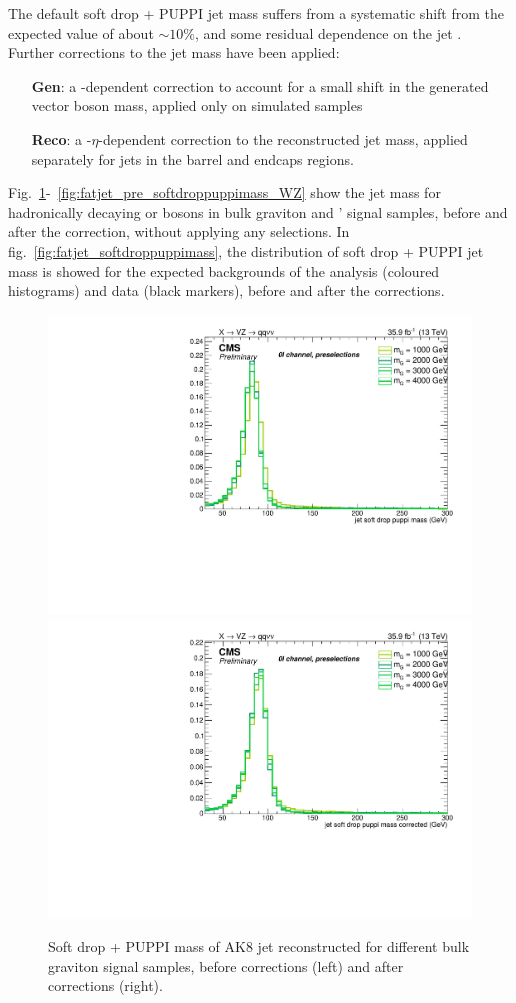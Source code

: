 \vspace*{1\baselineskip}

\noindent The default soft drop + PUPPI jet mass suffers from a systematic shift from the expected value of about $\sim 10\%$, and some residual dependence on the jet \pt. Further corrections to the jet mass have been applied:

\begin{enumerate}
  \item[{\bf Gen}:] a \pt-dependent correction to account for a small shift in the generated vector boson mass, applied only on simulated samples
  \item[{\bf Reco}:] a \pt-$\eta$-dependent correction to the reconstructed jet mass, applied separately for jets in the barrel and endcaps regions.
\end{enumerate}

\noindent Fig.~\ref{fig:fatjet_pre_softdroppuppimass_ZZ}-~\ref{fig:fatjet_pre_softdroppuppimass_WZ} show the jet mass for hadronically decaying \W or \Z bosons in bulk graviton and \W' signal samples, before and after the correction, without applying any selections. In fig.~\ref{fig:fatjet_softdroppuppimass}, the distribution of soft drop + PUPPI jet mass is showed for the expected backgrounds of the analysis (coloured histograms) and data (black markers), before and after the corrections.

\begin{figure}[!htb]
  \begin{center}
    \includegraphics[width=.495\textwidth]{plots/v9/XVZnnPre/FatJet1_softdropPuppiMass_signalZZ.pdf}
    \includegraphics[width=.495\textwidth]{plots/v9/XVZnnPre/FatJet1_softdropPuppiMassCorr_signalZZ.pdf}
  \end{center}
  \caption{Soft drop + PUPPI mass of AK8 jet reconstructed for different bulk graviton signal samples, before corrections (left) and after corrections (right).}
  \label{fig:fatjet_pre_softdroppuppimass_ZZ}
\end{figure}

